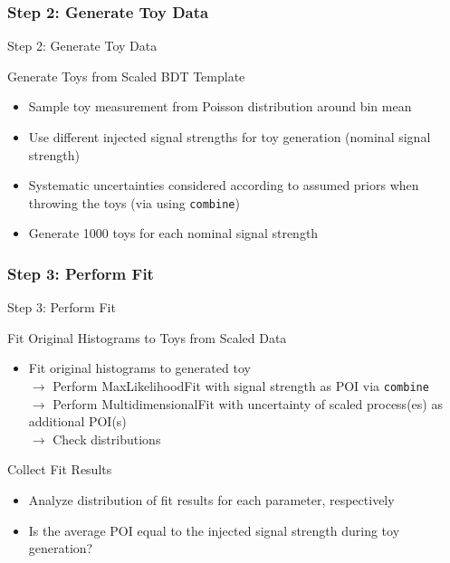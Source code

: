 \subsubsection{Step 2: Generate Toy Data}
\begin{frame}{Step 2: Generate Toy Data}
\begin{block}{Generate Toys from Scaled BDT Template}
\begin{itemize}
\item Sample toy measurement from Poisson distribution around bin mean
\item Use different injected signal strengths for toy generation (nominal signal strength)
\item Systematic uncertainties considered according to assumed priors when throwing the toys (via using \texttt{combine})
\item Generate \num{1000} toys for each nominal signal strength
\end{itemize}
\end{block}
\end{frame}

\subsubsection{Step 3: Perform Fit}

\begin{frame}{Step 3: Perform Fit}
\begin{block}{Fit Original Histograms to Toys from Scaled Data}
\begin{itemize}
\item Fit original histograms to generated toy\\
$\rightarrow$ Perform MaxLikelihoodFit with signal strength as POI via \texttt{combine}\\
$\rightarrow$ Perform MultidimensionalFit with uncertainty of scaled process(es) as additional POI(s)\\
$\rightarrow$ Check distributions
\end{itemize}
\end{block}

\begin{block}{Collect Fit Results}
\begin{itemize}
\item Analyze distribution of fit results for each parameter, respectively
\item Is the average POI equal to the injected signal strength during toy generation? 
\end{itemize}
\end{block}

\end{frame}


